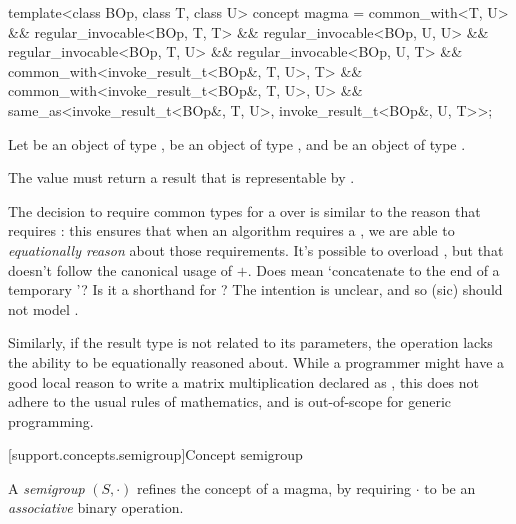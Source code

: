 \begin{itemdecl}
  template<class BOp, class T, class U>
  concept magma =
    common_with<T, U> &&
    regular_invocable<BOp, T, T> &&
    regular_invocable<BOp, U, U> &&
    regular_invocable<BOp, T, U> &&
    regular_invocable<BOp, U, T> &&
    common_with<invoke_result_t<BOp&, T, U>, T> &&
    common_with<invoke_result_t<BOp&, T, U>, U> &&
    same_as<invoke_result_t<BOp&, T, U>, invoke_result_t<BOp&, U, T>>;
\end{itemdecl}
\begin{itemdescr}
   \pnum
   Let  be an object of type ,  be an object of type , and
    be an object of type .

   \pnum
   The value  must return a result that is representable by
   .
\end{itemdescr}

The decision to require common types for a over  is similar to the reason that
 requires : this ensures that when
an algorithm requires a , we are able to \textit{equationally reason} about those
requirements. It's possible to overload , but that
doesn't follow the canonical usage of $+$. Does  mean `concatenate
 to the end of a temporary '? Is it a shorthand for
? The intention is unclear, and so  (sic)
should not model .


Similarly, if the result type is not related to its parameters, the operation lacks the ability to
be equationally reasoned about. While a programmer might have a good local reason to write a matrix
multiplication declared as , this does not
adhere to the usual rules of mathematics, and is out-of-scope for generic programming.

[support.concepts.semigroup]{Concept semigroup}

\pnum
A \textit{semigroup} $(S, \cdot)$ refines the concept of a magma, by requiring $\cdot$ to be an
\textit{associative} binary operation.

